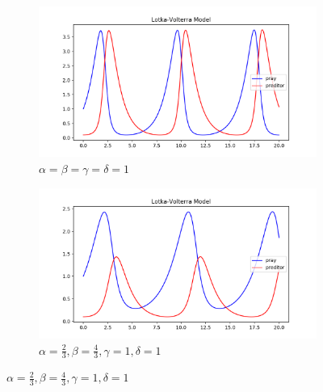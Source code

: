\documentclass[12pt, letterpaper]{article}
\begin{document}
\begin{figure}[!h]
  \caption{Examples of the Lotka-Volterra Model}
  \label{fig:lotkaVolterra}
  \begin{center}
    \begin{subfigure}[b]{.45\linewidth}
      \includegraphics[width=\linewidth]{LotkaVolterra/lotkaVolterra1}
      \caption{$ \alpha = \beta = \gamma = \delta = 1$}
    \end{subfigure}
    \begin{subfigure}[b]{.45\linewidth}
      \includegraphics[width=\linewidth]{LotkaVolterra/lotkaVolterra2}
      \caption{$ \alpha = \frac{2}{3}, \beta = \frac{4}{3}, \gamma = 1, \delta = 1 $}
    \end{subfigure}
  \end{center}
\end{figure}
\end{document}
